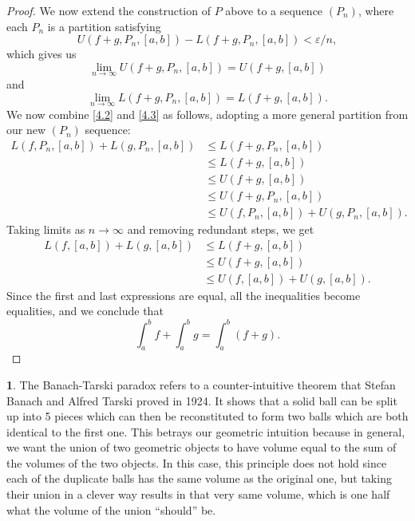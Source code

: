 \documentclass[12pt]{article}
\theoremstyle{definition}
\newtheorem{ex}{}
\begin{document}
\begin{proof}
	We now extend the construction of $P$ above to a sequence $(P_n)$, where each $P_n$ is a partition satisfying \begin{equation*}
		U(f + g, P_n, [a, b]) - L(f + g, P_n, [a, b]) < \varepsilon/n,
	\end{equation*}
	which gives us \begin{equation*}
		\lim_{n \to \infty} U(f + g, P_n, [a, b]) = U(f + g, [a, b])
	\end{equation*} and \begin{equation*}
		\lim_{n \to \infty} L(f + g, P_n, [a, b]) = L(f + g, [a, b]).
	\end{equation*}
	We now combine \eqref{4.2} and \eqref{4.3} as follows, adopting a more general partition from our new $(P_n)$ sequence: \begin{align*}
		L(f, P_n, [a, b]) + L(g, P_n, [a, b]) & \leq L(f + g, P_n, [a, b])                  \\
		                                      & \leq L(f + g, [a, b])                       \\
		                                      & \leq U(f + g, [a, b])                       \\
		                                      & \leq U(f + g, P_n, [a, b])                  \\
		                                      & \leq U(f, P_n, [a, b]) + U(g, P_n, [a, b]).
	\end{align*}
	Taking limits as $n \to \infty$ and removing redundant steps, we get \begin{align*}
		L(f, [a, b]) + L(g, [a, b]) & \leq L(f + g, [a, b])             \\
		                            & \leq U(f + g, [a, b])             \\
		                            & \leq U(f, [a, b]) + U(g, [a, b]).
	\end{align*}
	Since the first and last expressions are equal, all the inequalities become equalities, and we conclude that \begin{equation*}
		\int_a^b f + \int_a^b g = \int_a^b (f + g).
	\end{equation*}
\end{proof}

\begin{ex}
	The Banach-Tarski paradox refers to a counter-intuitive theorem that Stefan Banach and Alfred Tarski proved in 1924.
	It shows that a solid ball can be split up into 5 pieces which can then be reconstituted to form two balls which are both identical to the first one.
	This betrays our geometric intuition because in general, we want the union of two geometric objects to have volume equal to the sum of the volumes of the two objects.
	In this case, this principle does not hold since each of the duplicate balls has the same volume as the original one, but taking their union in a clever way results in that very same volume, which is one half what the volume of the union ``should'' be.
\end{ex}
\end{document}
